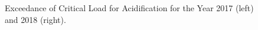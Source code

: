 \begin{figure}[ht]
  \centering
 \caption{Exceedance of Critical Load for Acidification for the Year 2017 (left) and 2018 (right).}
\label{fig:acid}
\end{figure}

\clearpage
\renewcommand\bibname{References}      %

